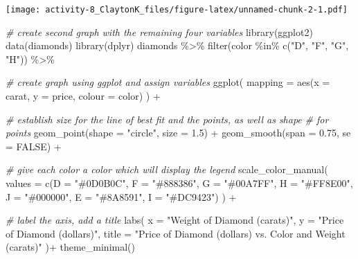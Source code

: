 \documentclass[
]{article}
\newenvironment{Shaded}{\begin{snugshade}}{\end{snugshade}}
\newcommand{\AttributeTok}[1]{\textcolor[rgb]{0.77,0.63,0.00}{#1}}
\newcommand{\CommentTok}[1]{\textcolor[rgb]{0.56,0.35,0.01}{\textit{#1}}}
\newcommand{\ConstantTok}[1]{\textcolor[rgb]{0.00,0.00,0.00}{#1}}
\newcommand{\FloatTok}[1]{\textcolor[rgb]{0.00,0.00,0.81}{#1}}
\newcommand{\FunctionTok}[1]{\textcolor[rgb]{0.00,0.00,0.00}{#1}}
\newcommand{\NormalTok}[1]{#1}
\newcommand{\SpecialCharTok}[1]{\textcolor[rgb]{0.00,0.00,0.00}{#1}}
\newcommand{\StringTok}[1]{\textcolor[rgb]{0.31,0.60,0.02}{#1}}
\begin{document}
\texttt{[image: activity-8\_ClaytonK\_files/figure-latex/unnamed-chunk-2-1.pdf]}

\begin{Shaded}
\begin{Highlighting}[]
\CommentTok{\# create second graph with the remaining four variables}
\FunctionTok{library}\NormalTok{(ggplot2)}
\FunctionTok{data}\NormalTok{(diamonds)}
\FunctionTok{library}\NormalTok{(dplyr)}
\NormalTok{diamonds }\SpecialCharTok{\%\textgreater{}\%}
\FunctionTok{filter}\NormalTok{(color }\SpecialCharTok{\%in\%} \FunctionTok{c}\NormalTok{(}\StringTok{"D"}\NormalTok{, }\StringTok{"F"}\NormalTok{, }\StringTok{"G"}\NormalTok{, }\StringTok{"H"}\NormalTok{)) }\SpecialCharTok{\%\textgreater{}\%}

\CommentTok{\# create graph using ggplot and assign variables}
\FunctionTok{ggplot}\NormalTok{(}
\AttributeTok{mapping =} \FunctionTok{aes}\NormalTok{(}\AttributeTok{x =}\NormalTok{ carat, }\AttributeTok{y =}\NormalTok{ price, }\AttributeTok{colour =}\NormalTok{ color)}
\NormalTok{) }\SpecialCharTok{+}

\CommentTok{\# establish size for the line of best fit and the points, as well as shape}
\CommentTok{\# for points}
\FunctionTok{geom\_point}\NormalTok{(}\AttributeTok{shape =} \StringTok{"circle"}\NormalTok{, }\AttributeTok{size =} \FloatTok{1.5}\NormalTok{) }\SpecialCharTok{+}
\FunctionTok{geom\_smooth}\NormalTok{(}\AttributeTok{span =} \FloatTok{0.75}\NormalTok{, }\AttributeTok{se =} \ConstantTok{FALSE}\NormalTok{) }\SpecialCharTok{+}

\CommentTok{\# give each color a color which will display the legend}
\FunctionTok{scale\_color\_manual}\NormalTok{(}
\AttributeTok{values =} \FunctionTok{c}\NormalTok{(}\AttributeTok{D =} \StringTok{"\#0D0B0C"}\NormalTok{,}
\AttributeTok{F =} \StringTok{"\#888386"}\NormalTok{,}
\AttributeTok{G =} \StringTok{"\#00A7FF"}\NormalTok{,}
\AttributeTok{H =} \StringTok{"\#FF8E00"}\NormalTok{,}
\AttributeTok{J =} \StringTok{"\#000000"}\NormalTok{,}
\AttributeTok{E =} \StringTok{"\#8A8591"}\NormalTok{,}
\AttributeTok{I =} \StringTok{"\#DC9423"}\NormalTok{)}
\NormalTok{) }\SpecialCharTok{+}

\CommentTok{\# label the axis, add a title}
\FunctionTok{labs}\NormalTok{(}
\AttributeTok{x =} \StringTok{"Weight of Diamond (carats)"}\NormalTok{,}
\AttributeTok{y =} \StringTok{"Price of Diamond (dollars)"}\NormalTok{,}
\AttributeTok{title =} \StringTok{"Price of Diamond (dollars) vs. Color and Weight (carats)"}
\NormalTok{)}\SpecialCharTok{+}
\FunctionTok{theme\_minimal}\NormalTok{()}
\end{Highlighting}
\end{Shaded}
\end{document}
